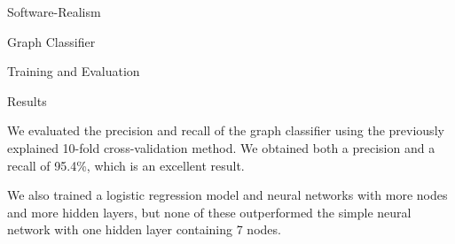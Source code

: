 \documentclass[11pt,twocolumn,a4paper,english]{article}
\begin{document}
\begin{section}{Software-Realism}
\begin{subsection}{Graph Classifier}
\begin{subsubsection}{Training and Evaluation}
\end{subsubsection}

\begin{subsubsection}{Results}
	
	We evaluated the precision and recall of the graph classifier using the previously explained 10-fold cross-validation method. We obtained both a precision and a recall of 95.4\%, which is an excellent result.
	
	
	We also trained a logistic regression model and neural networks with more nodes and more hidden layers, but none of these outperformed the simple neural network with one hidden layer containing 7 nodes.
	
	
\end{subsubsection}

\end{subsection}
	
\end{section}

\end{document}
